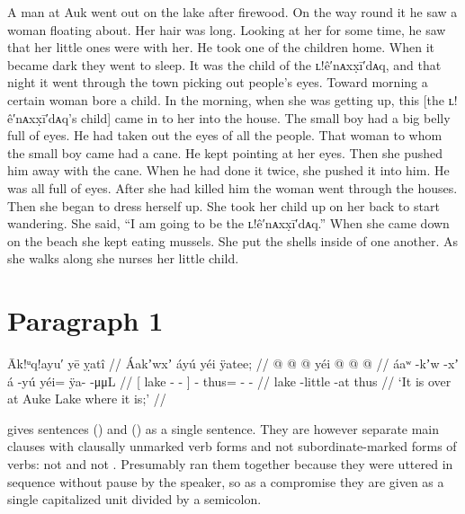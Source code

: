 A man at Auk went out on the lake after firewood.
On the way round it he saw a woman floating about.
Her hair was long.
Looking at her for some time, he saw that her little ones were with her.
He took one of the children home.
When it became dark they went to sleep.
It was the child of the ʟ!ê′nᴀxx̣ī′dᴀq, and that night it went through the town picking out people’s eyes.
Toward morning a certain woman bore a child.
In the morning, when she was getting up, this [the ʟ!ê′nᴀxx̣ī′dᴀq’s child] came in to her into the house.
The small boy had a big belly full of eyes.
He had taken out the eyes of all the people.
That woman to whom the small boy came had a cane.
He kept pointing at her eyes.
Then she pushed him away with the cane.
When he had done it twice, she pushed it into him.
He was all full of eyes.
After she had killed him the woman went through the
houses.
Then she began to dress herself up.
She took her child up on her back to start wandering.
She said, “I am going to be the ʟ!ê′nᴀxx̣ī′dᴀq.”
When she came down on the beach she kept eating mussels.
She put the shells inside of one another.
As she walks along she nurses her little child.

\section{Paragraph 1}\label{sec:94-para-1}

\ex\label{ex:94-1-at-auke-lake}%
%
\begingl
	\glpreamble	Āk!ᵘq!ayu′ yē ỵatî //
	\glpreamble	Áakʼwxʼ áyú yéi ÿatee; //
	\gla	{}  @ {} @ {} {}  @ {}
		yéi @  @ {} @ {} //
	\glb	{} áaʷ -kʼw -xʼ {} á -yú
		yéi= ÿa-  -μμL //
	\glc	{}[ lake - - {}]  -
		thus= -  - //
	\gld	{} lake -little -at {}  {}
		thus  {} {} //
	\glft	‘It is over at Auke Lake where it is;’
		//
\endgl
\xe

\citeauthor{swanton:1909} gives sentences (\lastx) and (\nextx) as a single sentence.
They are however separate main clauses with clausally unmarked verb forms and not subordinate-marked forms of verbs:  not  and  not .
Presumably \citeauthor{swanton:1909} ran them together because they were uttered in sequence without pause by the speaker, so as a compromise they are given as a single capitalized unit divided by a semicolon.

